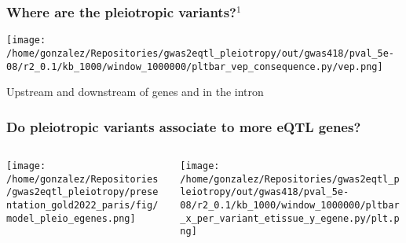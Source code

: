 \documentclass{beamer}
\begin{document}
\begin{frame}
\frametitle{Where are the pleiotropic variants?$^1$}

    \begin{center}
\texttt{[image: /home/gonzalez/Repositories/gwas2eqtl\_pleiotropy/out/gwas418/pval\_5e-08/r2\_0.1/kb\_1000/window\_1000000/pltbar\_vep\_consequence.py/vep.png]}
     \end{center}

Upstream and downstream of genes and in the intron

\let\thefootnote\relax{}
     
\end{frame}

\begin{frame}
\frametitle{Do pleiotropic variants associate to more eQTL genes?}

\begin{columns}
\begin{column}{0.5\textwidth}
    \begin{center}
\texttt{[image: /home/gonzalez/Repositories/gwas2eqtl\_pleiotropy/presentation\_gold2022\_paris/fig/model\_pleio\_egenes.png]}
     \end{center}
\end{column}
\begin{column}{0.5\textwidth}  %
    \begin{center}
\texttt{[image: /home/gonzalez/Repositories/gwas2eqtl\_pleiotropy/out/gwas418/pval\_5e-08/r2\_0.1/kb\_1000/window\_1000000/pltbar\_x\_per\_variant\_etissue\_y\_egene.py/plt.png]}
     \end{center}
\end{column}
\end{columns}

\end{frame}
\end{document}
